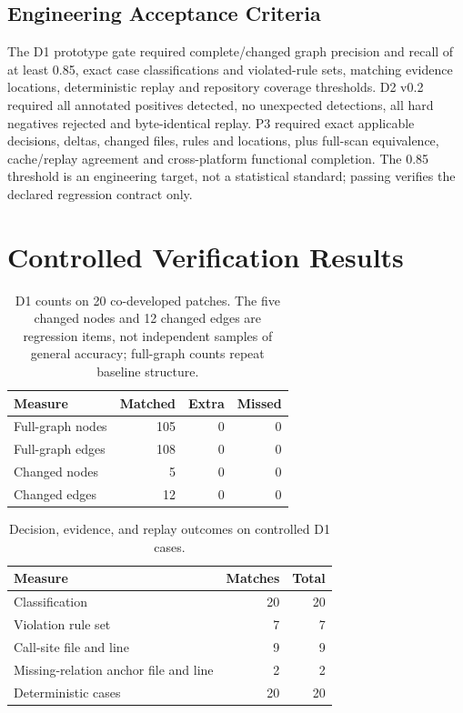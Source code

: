 \documentclass[conference]{IEEEtran}
\begin{document}
\subsection{Engineering Acceptance Criteria}

The D1 prototype gate required complete/changed graph precision and recall of at least 0.85, exact case classifications and violated-rule sets, matching evidence locations, deterministic replay and repository coverage thresholds. D2 v0.2 required all annotated positives detected, no unexpected detections, all hard negatives rejected and byte-identical replay. P3 required exact applicable decisions, deltas, changed files, rules and locations, plus full-scan equivalence, cache/replay agreement and cross-platform functional completion. The 0.85 threshold is an engineering target, not a statistical standard; passing verifies the declared regression contract only.

\section{Controlled Verification Results}

\begin{table}[t]
  \caption{D1 counts on 20 co-developed patches. The five changed nodes and 12 changed edges are regression items, not independent samples of general accuracy; full-graph counts repeat baseline structure.}
  \label{tab:detection-results}
  \centering
  \small
  \begin{tabular}{lrrr}
    \hline
    Measure & Matched & Extra & Missed \\
    \hline
    Full-graph nodes & 105 & 0 & 0 \\
    Full-graph edges & 108 & 0 & 0 \\
    Changed nodes & 5 & 0 & 0 \\
    Changed edges & 12 & 0 & 0 \\
    \hline
  \end{tabular}
\end{table}

\begin{table}[t]
  \caption{Decision, evidence, and replay outcomes on controlled D1 cases.}
  \label{tab:outcome-results}
  \centering
  \small
  \begin{tabular}{lrr}
    \hline
    Measure & Matches & Total \\
    \hline
    Classification & 20 & 20 \\
    Violation rule set & 7 & 7 \\
    Call-site file and line & 9 & 9 \\
    Missing-relation anchor file and line & 2 & 2 \\
    Deterministic cases & 20 & 20 \\
    \hline
  \end{tabular}
\end{table}
\end{document}
